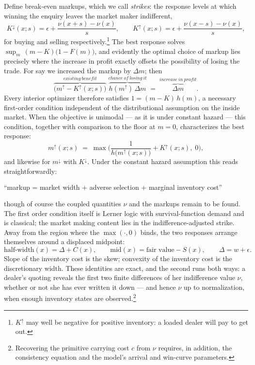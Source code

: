 \documentclass[11pt]{article}
\begin{document}
Define break-even markups, which we call \emph{strikes}: the response levels at which winning the enquiry leaves the market maker indifferent,
\[
K^{\downarrow}(x;s) = \epsilon + \frac{\nu(x+s)-\nu(x)}{s}, \qquad
K^{\uparrow}(x;s) = \epsilon + \frac{\nu(x-s)-\nu(x)}{s},
\]
for buying and selling respectively.\footnote{$K^{\uparrow}$ may well be negative for positive inventory: a loaded dealer will pay to get out.} The best response solves $\sup_m\, (m - K)\big(1-F(m)\big)$, and evidently the optimal choice of markup lies precisely where the increase in profit exactly offsets the possibility of losing the trade. For say we increased the markup by $\Delta m$; then
\[
\overbrace{\big(m^{\uparrow} - K^{\uparrow}(x;s)\big)}^{existing\ benefit}\;
\overbrace{h(m^{\uparrow})\,\Delta m}^{chance\ of\ losing\ it}
\;=\;
\overbrace{\Delta m}^{increase\ in\ profit} .
\]
Every interior optimizer therefore satisfies $1 = (m - K)\,h(m)$, a necessary first-order condition independent of the distributional assumption on the inside market. When the objective is unimodal --- as it is under constant hazard --- this condition, together with comparison to the floor at $m = 0$, characterizes the best response:
\begin{equation}
m^{\uparrow}(x;s) \;=\; \max\!\Big( \frac{1}{h\big(m^{\uparrow}(x;s)\big)} + K^{\uparrow}(x;s),\; 0 \Big),
\label{eq:foc}
\end{equation}
and likewise for $m^{\downarrow}$ with $K^{\downarrow}$. Under the constant hazard assumption this reads straightforwardly:
\begin{center}
``markup \;=\; market width \;+\; adverse selection \;+\; marginal inventory cost''
\end{center}
though of course the coupled quantities $\nu$ and the markups remain to be found. The first order condition itself is Lerner logic with survival-function demand and is classical; the market making content lies in the indifference-adjusted strike. Away from the region where the $\max(\cdot,0)$ binds, the two responses arrange themselves around a displaced midpoint:
\begin{equation}
\text{half-width}(x) = \Delta + C(x), \qquad
\text{mid}(x) = \text{fair value} - S(x), \qquad \Delta = w + \epsilon .
\label{eq:quotes}
\end{equation}
Slope of the inventory cost is the skew; convexity of the inventory cost is the discretionary width. These identities are exact, and the second runs both ways: a dealer's quoting reveals the first two finite differences of her indifference value $\nu$, whether or not she has ever written it down --- and hence $\nu$ up to normalization, when enough inventory states are observed.\footnote{Recovering the primitive carrying cost $c$ from $\nu$ requires, in addition, the consistency equation and the model's arrival and win-curve parameters.}
\end{document}
